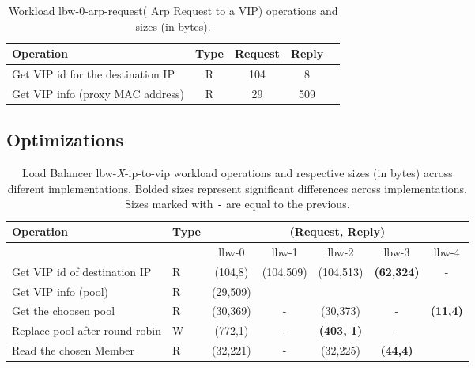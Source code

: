 \begin{table}[ht]
\small
\centering 
\begin{tabular}{l c c c c}
Operation & Type & Request & Reply \\ \toprule 
Get VIP id for the destination IP  & R & 104 & 8\\
Get VIP info (proxy MAC address) & R & 29 & 509 \\\bottomrule
\end{tabular}\caption[Workload lbw-0-arp-request( Arp Request to a
VIP) operations]{Workload lbw-0-arp-request( Arp Request to a VIP)
 operations and sizes (in bytes).}
\label{table:lbw-0-arp-request}
\end{table}

\subsection{Optimizations}
\begin{table}[ht]
\small
\begin{tabular}{llccccc}
 Operation & Type &  \multicolumn{5}{c}{ (Request, Reply) } \\  \midrule
&  & lbw-0 & lbw-1  & lbw-2 & lbw-3 & lbw-4 \\ \toprule 
Get VIP id of destination IP  & R & (104,8) &\multirow{2}{*}{(104,509)} &  \multirow{2}{*}{(104,513)} &\multirow{2}{*}{\textbf{(62,324)}} & \multirow{2}{*}{-}    \\\cmidrule{1-2} 
Get VIP info (pool)   & R &  (29,509) & & & &   \\ \midrule 
Get the choosen pool  & R & (30,369)  &  - & (30,373) & -   & \multirow{3}{*}[-2mm]{\textbf{(11,4)}}  \\  \cmidrule{1-2} 
Replace pool after round-robin  & W & (772,1) & -
&\textbf{(403, 1)} &  - \\ \cmidrule{1-2}  
  Read the chosen Member &  R & (32,221) & - & (32,225) & \textbf{(44,4)} & \\\bottomrule  
\end{tabular}\caption[Load Balancer IP to VIP workload operations across
diferent implementations.]{Load Balancer  lbw-\textit{X}-ip-to-vip workload
  operations and respective sizes (in bytes) across diferent
  implementations. Bolded sizes represent significant differences
  across implementations. Sizes marked with \texttt{-} are equal to
  the previous. } 
\end{table}

